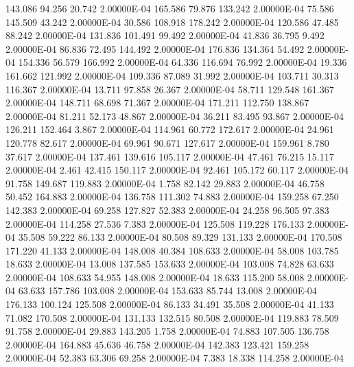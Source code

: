    143.086    94.256    20.742  2.00000E-04
   165.586    79.876   133.242  2.00000E-04
    75.586   145.509    43.242  2.00000E-04
    30.586   108.918   178.242  2.00000E-04
   120.586    47.485    88.242  2.00000E-04
   131.836   101.491    99.492  2.00000E-04
    41.836    36.795     9.492  2.00000E-04
    86.836    72.495   144.492  2.00000E-04
   176.836   134.364    54.492  2.00000E-04
   154.336    56.579   166.992  2.00000E-04
    64.336   116.694    76.992  2.00000E-04
    19.336   161.662   121.992  2.00000E-04
   109.336    87.089    31.992  2.00000E-04
   103.711    30.313   116.367  2.00000E-04
    13.711    97.858    26.367  2.00000E-04
    58.711   129.548   161.367  2.00000E-04
   148.711    68.698    71.367  2.00000E-04
   171.211   112.750   138.867  2.00000E-04
    81.211    52.173    48.867  2.00000E-04
    36.211    83.495    93.867  2.00000E-04
   126.211   152.464     3.867  2.00000E-04
   114.961    60.772   172.617  2.00000E-04
    24.961   120.778    82.617  2.00000E-04
    69.961    90.671   127.617  2.00000E-04
   159.961     8.780    37.617  2.00000E-04
   137.461   139.616   105.117  2.00000E-04
    47.461    76.215    15.117  2.00000E-04
     2.461    42.415   150.117  2.00000E-04
    92.461   105.172    60.117  2.00000E-04
    91.758   149.687   119.883  2.00000E-04
     1.758    82.142    29.883  2.00000E-04
    46.758    50.452   164.883  2.00000E-04
   136.758   111.302    74.883  2.00000E-04
   159.258    67.250   142.383  2.00000E-04
    69.258   127.827    52.383  2.00000E-04
    24.258    96.505    97.383  2.00000E-04
   114.258    27.536     7.383  2.00000E-04
   125.508   119.228   176.133  2.00000E-04
    35.508    59.222    86.133  2.00000E-04
    80.508    89.329   131.133  2.00000E-04
   170.508   171.220    41.133  2.00000E-04
   148.008    40.384   108.633  2.00000E-04
    58.008   103.785    18.633  2.00000E-04
    13.008   137.585   153.633  2.00000E-04
   103.008    74.828    63.633  2.00000E-04
   108.633    54.955   148.008  2.00000E-04
    18.633   115.200    58.008  2.00000E-04
    63.633   157.786   103.008  2.00000E-04
   153.633    85.744    13.008  2.00000E-04
   176.133   100.124   125.508  2.00000E-04
    86.133    34.491    35.508  2.00000E-04
    41.133    71.082   170.508  2.00000E-04
   131.133   132.515    80.508  2.00000E-04
   119.883    78.509    91.758  2.00000E-04
    29.883   143.205     1.758  2.00000E-04
    74.883   107.505   136.758  2.00000E-04
   164.883    45.636    46.758  2.00000E-04
   142.383   123.421   159.258  2.00000E-04
    52.383    63.306    69.258  2.00000E-04
     7.383    18.338   114.258  2.00000E-04
